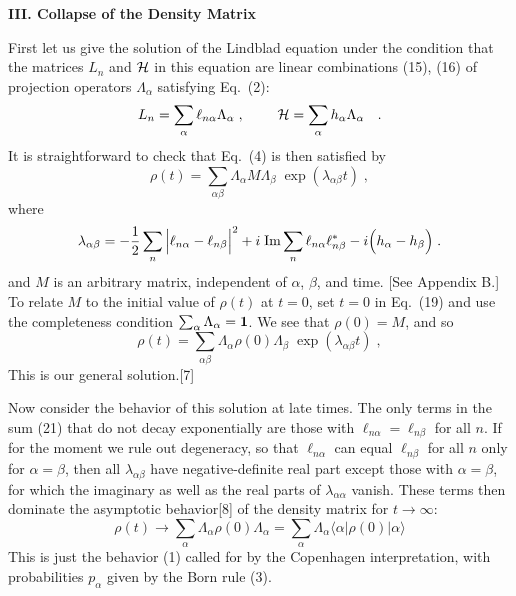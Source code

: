\documentclass[12pt]{article}
\def\BM#1{\mbox{\boldmath{$#1$}}}
\begin{document}
\begin{center}
{\bf III. Collapse of the Density Matrix}
\end{center}

First let us give the solution of the Lindblad equation under the condition that the matrices $L_n$ and ${\cal H}$ in this equation are linear combinations (15), (16) of projection operators $\Lambda_\alpha$ satisfying Eq.~(2):
$$ 
L_n=\sum_{\alpha}\ell_{n\alpha}\Lambda_\alpha\;,~~~~~~~
{\cal H}=\sum_{\alpha}h_{\alpha}\Lambda_\alpha~~\;.$$
It is straightforward to check that Eq.~(4) is then satisfied by
\begin{equation}
\rho(t)=\sum_{\alpha\beta}\Lambda_\alpha M \Lambda_\beta\;\exp(\lambda_{\alpha\beta}t)\;,
\end{equation}
where
\begin{equation}
\lambda_{\alpha\beta}=-\frac{1}{2}\sum_n\Big|\ell_{n\alpha}-\ell_{n\beta}\Big|^2+i\;{\rm Im}\sum_n \ell_{n\alpha}\ell^*_{n\beta}
-i\Big(h_{\alpha}-h_{\beta}\Big)\;.
\end{equation}
and $M$ is an arbitrary  matrix, independent of $\alpha$, $\beta$, and time. [See Appendix B.]  To relate $M$ to the initial value of $\rho(t)$ at $t=0$, set $t=0$ in Eq.~(19) and use the completeness condition $\sum_\alpha\Lambda_\alpha=\BM{1}$.  We see that $\rho(0)=M$, and so
\begin{equation}
\rho(t)=\sum_{\alpha\beta}\Lambda_\alpha \rho(0) \Lambda_\beta\;\exp(\lambda_{\alpha\beta}t)\;,
\end{equation}
This is our general solution.[7]

Now consider the behavior of this solution at late times.  The only terms in the sum (21) that do not decay exponentially are those with $\ell_{n\alpha}=\ell_{n\beta}$ for all $n$.  
If for the moment we rule out degeneracy,  so that $\ell_{n\alpha}$ can equal $\ell_{n\beta}$ for all $n$ only for $\alpha=\beta$, then all $\lambda_{\alpha\beta}$ have negative-definite real part except those with $\alpha=\beta$, for which the imaginary as well as the real parts of $\lambda_{\alpha\alpha}$ vanish.  These terms then dominate the asymptotic behavior[8]  of the density matrix for $t\rightarrow \infty$:
\begin{equation}
\rho(t)\rightarrow \sum_\alpha \Lambda_\alpha\rho(0)\Lambda_\alpha=\sum_\alpha \Lambda_\alpha \langle \alpha|\rho(0)|\alpha\rangle
\end{equation}
This is just the behavior (1) called for by the Copenhagen interpretation, with probabilities $p_\alpha$ given by the Born rule (3).  
\end{document}
